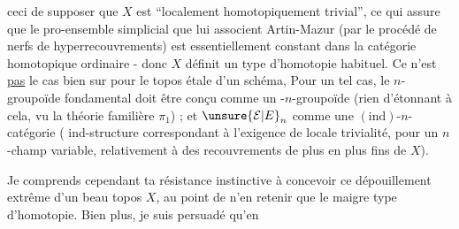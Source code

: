 ceci de supposer que $X$ est ``localement homotopiquement trivial'', ce qui assure que le pro-ensemble simplicial que lui associent Artin-Mazur (par le procédé de nerfs de hyperrecouvrements) est essentiellement constant dans la catégorie homotopique ordinaire - donc $X$ définit un type d'homotopie habituel. Ce n'est \uline{pas} le cas bien sur pour le topos étale d'un schéma, Pour un tel cas, le $n$-groupoïde fondamental doit être conçu comme un -$n$-groupoïde (rien d'étonnant à cela, vu la théorie familière  $\pi_1$) ; et $\unsure{\mathcal E|E}_n$ comme une $(\mathrm{ind})$-$n$-catégorie ( ind-structure correspondant à l'exigence de locale trivialité, pour un $n$-champ variable, relativement à des recouvrements de plus en plus fins de $X$).


Je comprends cependant ta résistance instinctive à concevoir ce dépouillement extrême d'un beau topos $X$, au point de n'en retenir que le maigre type d'homotopie. Bien plus, je suis persuadé qu'en
